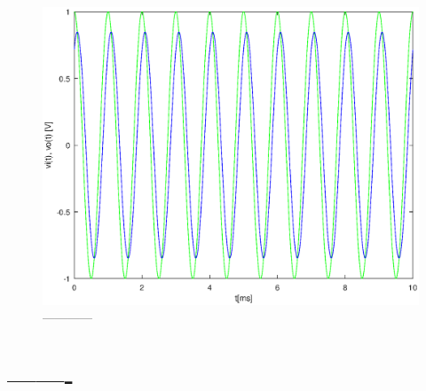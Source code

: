 \begin{figure}[h] \centering
\includegraphics[width=0.8\linewidth]{forced.eps}
\caption{------------}
\label{fig:forced}
\end{figure}

\section{-------}

